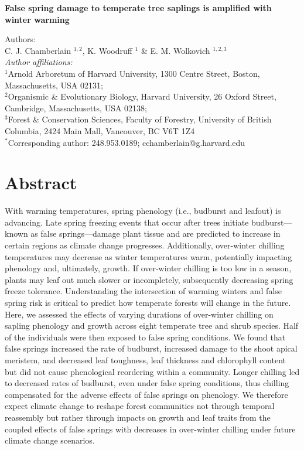 \documentclass{article}\usepackage[]{graphicx}\usepackage[]{color}
\begin{document}
\noindent \textbf{\Large{False spring damage to temperate tree saplings is amplified with winter warming}}

\noindent Authors:\\
C. J. Chamberlain $^{1,2}$, K. Woodruff $^{1}$ \& E. M. Wolkovich $^{1,2,3}$
\vspace{2ex}\\
\emph{Author affiliations:}\\
$^{1}$Arnold Arboretum of Harvard University, 1300 Centre Street, Boston, Massachusetts, USA 02131; \\
$^{2}$Organismic \& Evolutionary Biology, Harvard University, 26 Oxford Street, Cambridge, Massachusetts, USA 02138; \\
$^{3}$Forest \& Conservation Sciences, Faculty of Forestry, University of British Columbia, 2424 Main Mall, Vancouver, BC V6T 1Z4\\
\vspace{2ex}
$^*$Corresponding author: 248.953.0189; cchamberlain@g.harvard.edu\\

\renewcommand{\thetable}{\arabic{table}}
\renewcommand{\thefigure}{\arabic{figure}}
\renewcommand{\labelitemi}{$-$}


\section*{Abstract}
With warming temperatures, spring phenology (i.e., budburst and leafout) is advancing. Late spring freezing events that occur after trees initiate budburst---known as false springs---damage plant tissue and are predicted to increase in certain regions as climate change progresses. Additionally, over-winter chilling temperatures may decrease as winter temperatures warm, potentially impacting phenology and, ultimately, growth. If over-winter chilling is too low in a season, plants may leaf out much slower or incompletely, subsequently decreasing spring freeze tolerance. Understanding the intersection of warming winters and false spring risk is critical to predict how temperate forests will change in the future. Here, we assessed the effects of varying durations of over-winter chilling on sapling phenology and growth across eight temperate tree and shrub species. Half of the individuals were then exposed to false spring conditions. We found that false springs increased the rate of budburst, increased damage to the shoot apical meristem, and decreased leaf toughness, leaf thickness and chlorophyll content but did not cause phenological reordering within a community. Longer chilling led to decreased rates of budburst, even under false spring conditions, thus chilling compensated for the adverse effects of false springs on phenology. We therefore expect climate change to reshape forest communities not through temporal reassembly but rather through impacts on growth and leaf traits from the coupled effects of false springs with decreases in over-winter chilling under future climate change scenarios.
\end{document}
